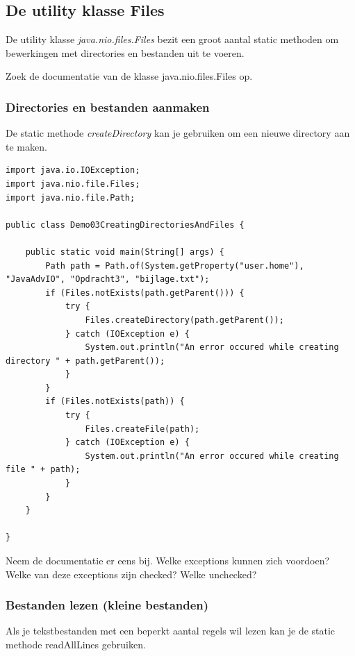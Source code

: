 \subsection{De utility klasse Files}

De utility klasse \textit{java.nio.files.Files} bezit een groot aantal static methoden om bewerkingen met directories en bestanden uit te voeren.

\begin{oefening}
Zoek de documentatie van de klasse java.nio.files.Files op.
\end{oefening}

\subsubsection{Directories en bestanden aanmaken}

De static methode \textit{createDirectory} kan je gebruiken om een nieuwe directory aan te maken. 


\begin{lstlisting}
import java.io.IOException;
import java.nio.file.Files;
import java.nio.file.Path;

public class Demo03CreatingDirectoriesAndFiles {

	public static void main(String[] args) {
		Path path = Path.of(System.getProperty("user.home"), "JavaAdvIO", "Opdracht3", "bijlage.txt");
		if (Files.notExists(path.getParent())) {
			try {
				Files.createDirectory(path.getParent());
			} catch (IOException e) {
				System.out.println("An error occured while creating directory " + path.getParent());
			}
		}
		if (Files.notExists(path)) {
			try {
				Files.createFile(path);
			} catch (IOException e) {
				System.out.println("An error occured while creating file " + path);
			}
		}
	}

}
\end{lstlisting}

\begin{oefening}
Neem de documentatie er eens bij. Welke exceptions kunnen zich voordoen? Welke van deze exceptions zijn checked? Welke unchecked?
\end{oefening}


\subsubsection{Bestanden lezen (kleine bestanden)}

Als je tekstbestanden met een beperkt aantal regels wil lezen kan je de static methode readAllLines gebruiken.

